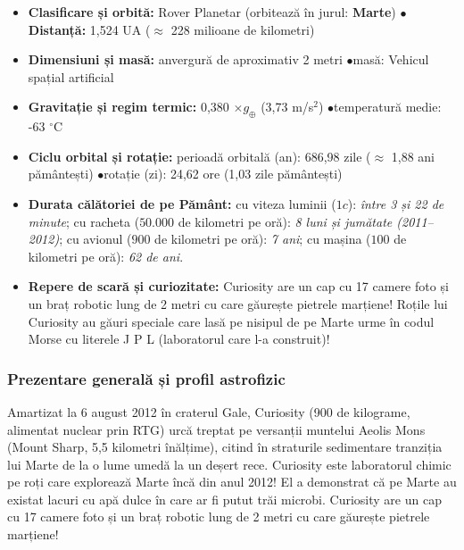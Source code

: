 \begin{tcolorbox}[orbitardata, title={\textbf{Repere esențiale: Curiosity (Mars Science Laboratory)}}]
\small
\begin{itemize}[leftmargin=1.4em, itemsep=2pt, topsep=2pt]
  \item \textbf{Clasificare și orbită:} Rover Planetar (orbitează în jurul: \textbf{Marte}) \quad$\bullet$\quad \textbf{Distanță:} 1,524 UA ($\approx$ 228 milioane de kilometri)
  \item \textbf{Dimensiuni și masă:} anvergură de aproximativ 2 metri \quad$\bullet$\quad masă: Vehicul spațial artificial
  \item \textbf{Gravitație și regim termic:} 0,380 $\times g_\oplus$ (3,73 m/s$^2$) \quad$\bullet$\quad temperatură medie: -63 $^\circ$C
  \item \textbf{Ciclu orbital și rotație:} perioadă orbitală (an): 686,98 zile ($\approx$ 1,88 ani pământești) \quad$\bullet$\quad rotație (zi): 24,62 ore (1,03 zile pământești)
  \item \textbf{Durata călătoriei de pe Pământ:} cu viteza luminii ($1c$): \emph{între 3 și 22 de minute}; cu racheta ($50.000$ de kilometri pe oră): \emph{8 luni și jumătate (2011--2012)}; cu avionul ($900$ de kilometri pe oră): \emph{7 ani}; cu mașina ($100$ de kilometri pe oră): \emph{62 de ani}.
  \item \textbf{Repere de scară și curiozitate:} Curiosity are un \guillemotleft{}cap\guillemotright{} cu 17 camere foto și un braț robotic lung de 2 metri cu care găurește pietrele marțiene! Roțile lui Curiosity au găuri speciale care lasă pe nisipul de pe Marte urme în codul Morse cu literele \guillemotleft{}J P L\guillemotright{} (laboratorul care l-a construit)!
\end{itemize}
\end{tcolorbox}

\subsubsection*{Prezentare generală și profil astrofizic}
Amartizat la 6 august 2012 în craterul Gale, Curiosity (900 de kilograme, alimentat nuclear prin RTG) urcă treptat pe versanții muntelui Aeolis Mons (Mount Sharp, 5,5 kilometri înălțime), citind în straturile sedimentare tranziția lui Marte de la o lume umedă la un deșert rece. Curiosity este laboratorul chimic pe roți care explorează Marte încă din anul 2012! El a demonstrat că pe Marte au existat lacuri cu apă dulce în care ar fi putut trăi microbi. Curiosity are un \guillemotleft{}cap\guillemotright{} cu 17 camere foto și un braț robotic lung de 2 metri cu care găurește pietrele marțiene!

